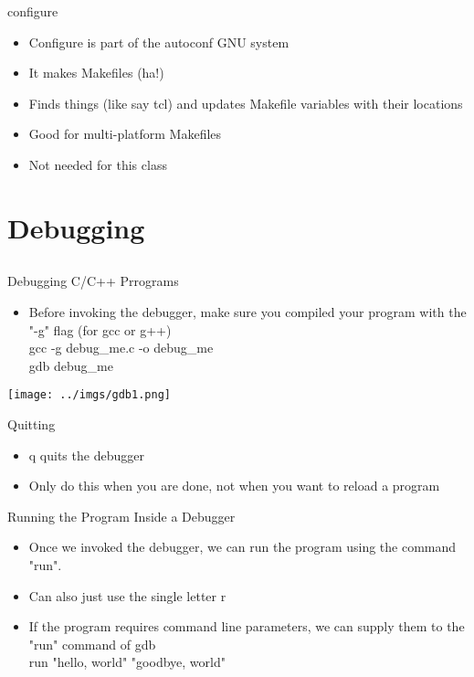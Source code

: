 \documentclass{beamer}
\begin{document}
\begin{frame}{configure}
\begin{itemize}
\item Configure is part of the autoconf GNU system
\item It makes Makefiles (ha!)
\item Finds things (like say tcl) and updates Makefile variables with their locations
\item Good for multi-platform Makefiles
\item Not needed for this class
\end{itemize}
\end{frame}

\section{Debugging}
\subsection{}

\begin{frame}{Debugging C/C++ Prrograms}
\begin{itemize}
\item Before invoking the debugger, make sure you compiled your program with the "-g" flag (for gcc or g++) \\
gcc -g debug\_me.c -o debug\_me \\
gdb debug\_me
\end{itemize}
\texttt{[image: ../imgs/gdb1.png]}
\end{frame}

\begin{frame}{Quitting}
\begin{itemize}
\item q quits the debugger
\item Only do this when you are done, not when you want to reload a program
\end{itemize}
\end{frame}

\begin{frame}{Running the Program Inside a Debugger}
\begin{itemize}
\item Once we invoked the debugger, we can run the program using the command "run".
\item Can also just use the single letter r
\item If the program requires command line parameters, we can supply them to the "run" command of gdb \\
run "hello, world" "goodbye, world"
\end{itemize}
\end{frame}
\end{document}
